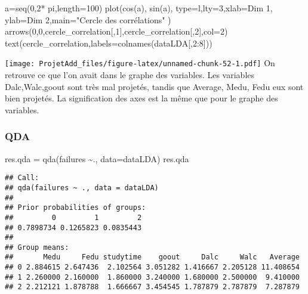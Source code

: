 \documentclass[
]{article}
\newenvironment{Shaded}{\begin{snugshade}}{\end{snugshade}}
\newcommand{\AttributeTok}[1]{\textcolor[rgb]{0.77,0.63,0.00}{#1}}
\newcommand{\DecValTok}[1]{\textcolor[rgb]{0.00,0.00,0.81}{#1}}
\newcommand{\FunctionTok}[1]{\textcolor[rgb]{0.00,0.00,0.00}{#1}}
\newcommand{\NormalTok}[1]{#1}
\newcommand{\OtherTok}[1]{\textcolor[rgb]{0.56,0.35,0.01}{#1}}
\newcommand{\SpecialCharTok}[1]{\textcolor[rgb]{0.00,0.00,0.00}{#1}}
\newcommand{\StringTok}[1]{\textcolor[rgb]{0.31,0.60,0.02}{#1}}
\begin{document}
\begin{Shaded}
\begin{Highlighting}[]
\NormalTok{a}\OtherTok{=}\FunctionTok{seq}\NormalTok{(}\DecValTok{0}\NormalTok{,}\DecValTok{2}\SpecialCharTok{*}\NormalTok{ pi,}\AttributeTok{length=}\DecValTok{100}\NormalTok{)}
\FunctionTok{plot}\NormalTok{(}\FunctionTok{cos}\NormalTok{(a), }\FunctionTok{sin}\NormalTok{(a), }\AttributeTok{type=}\StringTok{\textquotesingle{}l\textquotesingle{}}\NormalTok{,}\AttributeTok{lty=}\DecValTok{3}\NormalTok{,}\AttributeTok{xlab=}\StringTok{\textquotesingle{}Dim 1\textquotesingle{}}\NormalTok{, }\AttributeTok{ylab=}\StringTok{\textquotesingle{}Dim}
\StringTok{2\textquotesingle{}}\NormalTok{,}\AttributeTok{main=}\StringTok{"Cercle des corrélations"}\NormalTok{ )}
\FunctionTok{arrows}\NormalTok{(}\DecValTok{0}\NormalTok{,}\DecValTok{0}\NormalTok{,cercle\_correlation[,}\DecValTok{1}\NormalTok{],cercle\_correlation[,}\DecValTok{2}\NormalTok{],}\AttributeTok{col=}\DecValTok{2}\NormalTok{)}
\FunctionTok{text}\NormalTok{(cercle\_correlation,}\AttributeTok{labels=}\FunctionTok{colnames}\NormalTok{(dataLDA[,}\DecValTok{2}\SpecialCharTok{:}\DecValTok{8}\NormalTok{]))}
\end{Highlighting}
\end{Shaded}

\texttt{[image: ProjetAdd\_files/figure-latex/unnamed-chunk-52-1.pdf]} On
retrouve ce que l'on avait dans le graphe des variables. Les variables
Dalc,Walc,goout sont très mal projetés, tandis que Average, Medu, Fedu
eux sont bien projetés. La signification des axes est la même que pour
le graphe des variables.

\hypertarget{qda}{%
\subsubsection{QDA}\label{qda}}

\begin{Shaded}
\begin{Highlighting}[]
\NormalTok{res.qda }\OtherTok{=} \FunctionTok{qda}\NormalTok{(failures }\SpecialCharTok{\textasciitilde{}}\NormalTok{., }\AttributeTok{data=}\NormalTok{dataLDA)}
\NormalTok{res.qda}
\end{Highlighting}
\end{Shaded}

\begin{verbatim}
## Call:
## qda(failures ~ ., data = dataLDA)
## 
## Prior probabilities of groups:
##         0         1         2 
## 0.7898734 0.1265823 0.0835443 
## 
## Group means:
##       Medu     Fedu studytime    goout     Dalc     Walc   Average
## 0 2.884615 2.647436  2.102564 3.051282 1.416667 2.205128 11.408654
## 1 2.260000 2.160000  1.860000 3.240000 1.680000 2.500000  9.410000
## 2 2.212121 1.878788  1.666667 3.454545 1.787879 2.787879  7.287879
\end{verbatim}
\end{document}
